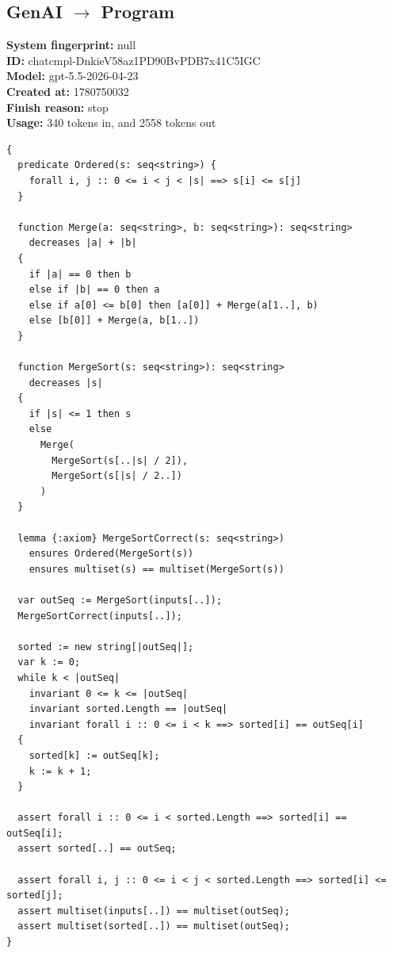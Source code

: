\documentclass{article}
\begin{document}
\subsection*{GenAI $\rightarrow$ Program}
\textbf{System fingerprint: }null
\\\textbf{ID: }chatcmpl-DnkieV58az1PD90BvPDB7x41C5IGC
\\\textbf{Model: }gpt-5.5-2026-04-23
\\\textbf{Created at: }1780750032
\\\textbf{Finish reason: }stop
\\\textbf{Usage: }340 tokens in, and 2558 tokens out
\begin{lstlisting}
{
  predicate Ordered(s: seq<string>) {
    forall i, j :: 0 <= i < j < |s| ==> s[i] <= s[j]
  }

  function Merge(a: seq<string>, b: seq<string>): seq<string>
    decreases |a| + |b|
  {
    if |a| == 0 then b
    else if |b| == 0 then a
    else if a[0] <= b[0] then [a[0]] + Merge(a[1..], b)
    else [b[0]] + Merge(a, b[1..])
  }

  function MergeSort(s: seq<string>): seq<string>
    decreases |s|
  {
    if |s| <= 1 then s
    else
      Merge(
        MergeSort(s[..|s| / 2]),
        MergeSort(s[|s| / 2..])
      )
  }

  lemma {:axiom} MergeSortCorrect(s: seq<string>)
    ensures Ordered(MergeSort(s))
    ensures multiset(s) == multiset(MergeSort(s))

  var outSeq := MergeSort(inputs[..]);
  MergeSortCorrect(inputs[..]);

  sorted := new string[|outSeq|];
  var k := 0;
  while k < |outSeq|
    invariant 0 <= k <= |outSeq|
    invariant sorted.Length == |outSeq|
    invariant forall i :: 0 <= i < k ==> sorted[i] == outSeq[i]
  {
    sorted[k] := outSeq[k];
    k := k + 1;
  }

  assert forall i :: 0 <= i < sorted.Length ==> sorted[i] == outSeq[i];
  assert sorted[..] == outSeq;

  assert forall i, j :: 0 <= i < j < sorted.Length ==> sorted[i] <= sorted[j];
  assert multiset(inputs[..]) == multiset(outSeq);
  assert multiset(sorted[..]) == multiset(outSeq);
}
\end{lstlisting}
\end{document}
